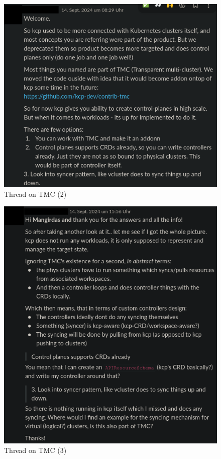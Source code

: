 \documentclass[11pt, a4paper, oneside, listof=totoc]{scrartcl}
\begin{document}
                \begin{figure}[h!]
                    \centering
                    \includegraphics[width=\textwidth]{screenshots/slack/tmc2.anonymized.png}
                    \caption{Thread on TMC (2)}\label{fig:tmc2}
                \end{figure}

                \begin{figure}[h!]
                    \centering
                    \includegraphics[width=\textwidth]{screenshots/slack/tmc3.anonymized.png}
                    \caption{Thread on TMC (3)}\label{fig:tmc3}
                \end{figure}
\end{document}
